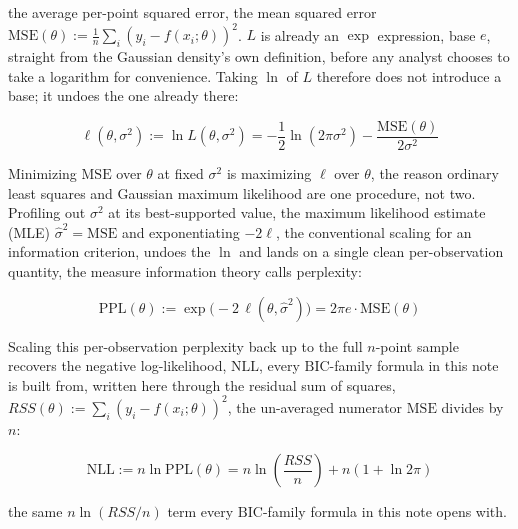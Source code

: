 \documentclass[11pt]{article}
\begin{document}
the average per-point squared error, the mean squared error
$\mathrm{MSE}(\theta) := \frac{1}{n}\sum_i (y_i - f(x_i;\theta))^2$.
$L$ is already an $\exp$ expression, base $e$, straight from the Gaussian
density's own definition, before any analyst chooses to take a logarithm
for convenience. Taking $\ln$ of $L$ therefore does not introduce a base;
it undoes the one already there:

\begin{equation}
\ell(\theta,\sigma^2) := \ln L(\theta,\sigma^2)
= -\frac{1}{2}\ln(2\pi\sigma^2) - \frac{\mathrm{MSE}(\theta)}{2\sigma^2}
\end{equation}

Minimizing $\mathrm{MSE}$ over $\theta$ at fixed $\sigma^2$ is maximizing
$\ell$ over $\theta$, the reason ordinary least squares and Gaussian
maximum likelihood are one procedure, not two. Profiling out $\sigma^2$ at
its best-supported value, the maximum likelihood estimate (MLE)
$\hat\sigma^2 = \mathrm{MSE}$ and exponentiating $-2\ell$, the
conventional scaling for an information criterion, undoes the $\ln$ and
lands on a single clean per-observation quantity, the measure information
theory calls perplexity:

\begin{equation}
\mathrm{PPL}(\theta) := \exp\!\big(-2\,\ell(\theta,\hat\sigma^2)\big) = 2\pi e \cdot \mathrm{MSE}(\theta)
\end{equation}

Scaling this per-observation perplexity back up to the full $n$-point
sample recovers the negative log-likelihood, $\mathrm{NLL}$, every
$\mathrm{BIC}$-family formula in this note is built from, written here
through the residual sum of squares, $RSS(\theta) := \sum_i (y_i -
f(x_i;\theta))^2$, the un-averaged numerator $\mathrm{MSE}$ divides by
$n$:

\begin{equation}
\mathrm{NLL} := n \ln \mathrm{PPL}(\theta) = n \ln\!\left(\frac{RSS}{n}\right) + n(1 + \ln 2\pi)
\end{equation}

the same $n\ln(RSS/n)$ term every $\mathrm{BIC}$-family formula in this
note opens with.
\end{document}
